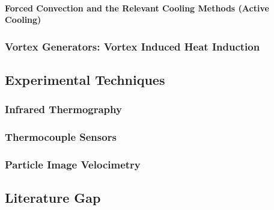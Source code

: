 \paragraph{Forced Convection and the Relevant Cooling Methods (Active Cooling)} %
\subsubsection{Vortex Generators: Vortex Induced Heat Induction} %

\pagebreak
\subsection{Experimental Techniques}
\subsubsection{Infrared Thermography}
\subsubsection{Thermocouple Sensors}
\subsubsection{Particle Image Velocimetry}

\pagebreak
\subsection{Literature Gap}

\pagebreak



